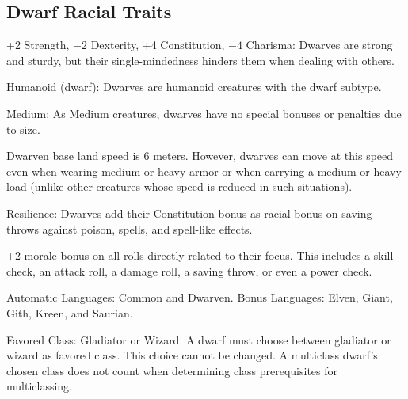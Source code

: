 \subsection{Dwarf Racial Traits}
\begin{itemize*}
    \item +2 Strength, $-2$ Dexterity, +4 Constitution, $-4$ Charisma: Dwarves are strong and sturdy, but their single-mindedness hinders them when dealing with others.
    \item Humanoid (dwarf): Dwarves are humanoid creatures with the dwarf subtype.
    \item Medium: As Medium creatures, dwarves have no special bonuses or penalties due to size.
    \item Dwarven base land speed is 6 meters. However, dwarves can move at this speed even when wearing medium or heavy armor or when carrying a medium or heavy load (unlike other creatures whose speed is reduced in such situations).
    \item Resilience: Dwarves add their Constitution bonus as racial bonus on saving throws against poison, spells, and spell-like effects.
    \item +2 morale bonus on all rolls directly related to their focus. This includes a skill check, an attack roll, a damage roll, a saving throw, or even a power check.
    \item Automatic Languages: Common and Dwarven. Bonus Languages: Elven, Giant, Gith, Kreen, and Saurian.
    \item Favored Class: Gladiator or Wizard. A dwarf must choose between gladiator or wizard as favored class. This choice cannot be changed. A multiclass dwarf's chosen class does not count when determining class prerequisites for multiclassing.
\end{itemize*}
